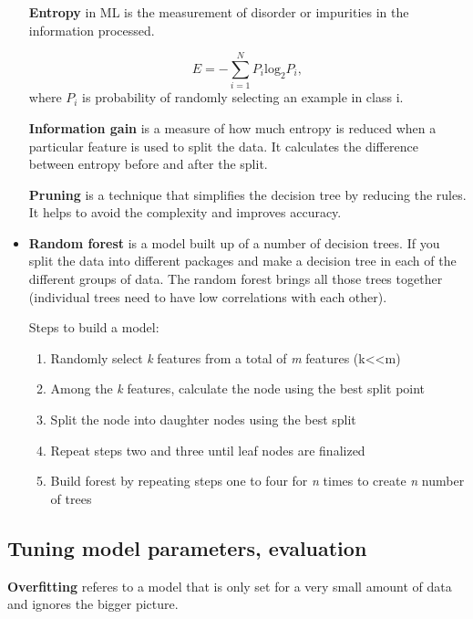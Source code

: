 \documentclass[
  letterpaper,
  DIV=11,
  numbers=noendperiod]{scrreprt}
\providecommand{\tightlist}{%
  \setlength{\itemsep}{0pt}\setlength{\parskip}{0pt}}\usepackage{longtable,booktabs,array}
\begin{document}
\begin{itemize}
  \textbf{Entropy} in ML is the measurement of disorder or impurities in
  the information processed.

  \[ E = -\sum^{N}_{i=1}P_{i}\text{log}_{2}P_{i}, \] where \(P_{i}\) is
  probability of randomly selecting an example in class i.

  \textbf{Information gain} is a measure of how much entropy is reduced
  when a particular feature is used to split the data. It calculates the
  difference between entropy before and after the split.

  \textbf{Pruning} is a technique that simplifies the decision tree by
  reducing the rules. It helps to avoid the complexity and improves
  accuracy.
\item
  \textbf{Random forest} is a model built up of a number of decision
  trees. If you split the data into different packages and make a
  decision tree in each of the different groups of data. The random
  forest brings all those trees together (individual trees need to have
  low correlations with each other).

  Steps to build a model:

  \begin{enumerate}
  \def\labelenumi{\arabic{enumi}.}
  \tightlist
  \item
    Randomly select \emph{k} features from a total of \emph{m} features
    (k\textless\textless m)
  \item
    Among the \emph{k} features, calculate the node using the best split
    point
  \item
    Split the node into daughter nodes using the best split
  \item
    Repeat steps two and three until leaf nodes are finalized
  \item
    Build forest by repeating steps one to four for \emph{n} times to
    create \emph{n} number of trees
  \end{enumerate}
\end{itemize}

\hypertarget{tuning-model-parameters-evaluation}{%
\subsection{Tuning model parameters,
evaluation}\label{tuning-model-parameters-evaluation}}

\textbf{Overfitting} referes to a model that is only set for a very
small amount of data and ignores the bigger picture.
\end{document}
